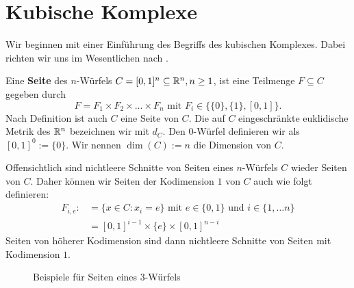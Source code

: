 \section{Kubische Komplexe}
	Wir beginnen mit einer Einführung des Begriffs des kubischen Komplexes. Dabei richten wir uns im Wesentlichen nach \cite{SchwerLectureNotes}.

\begin{defn}
	Eine \textbf{Seite} des $n$-Würfels $C=[0,1]^n \subseteq \mathbb{R}^n, n \geq 1$, ist eine Teilmenge $F \subseteq C$ gegeben durch
	\[
		F = F_1 \times F_2 \times \dots \times F_n \text{ mit } F_i \in \{ \{0\}, \{1\}, [0,1]\}.
	\]
	Nach Definition ist auch $C$ eine Seite von $C$. Die auf $C$ eingeschränkte euklidische Metrik des $\mathbb{R}^n$ bezeichnen wir mit $d_C$. Den $0$-Würfel definieren wir als $[0,1]^0 := \{0\}$. Wir nennen $\dim(C) := n$ die Dimension von $C$.
\end{defn}

	Offensichtlich sind nichtleere Schnitte von Seiten eines $n$-Würfels $C$ wieder Seiten von $C$. Daher können wir Seiten der Kodimension $1$ von $C$ auch wie folgt definieren:
	\begin{equation}
	\begin{aligned}
		F_{i,e} :&= \{x \in C : x_i = e\} \text{ mit } e \in \{0,1\} \text{ und } i \in \{1, \dots n\} \\
		&= [0,1]^{i-1} \times \{e\} \times [0,1]^{n-i}
	\end{aligned}
	\end{equation}
	Seiten von höherer Kodimension sind dann nichtleere Schnitte von Seiten mit Kodimension $1$.
	
\begin{figure}[h]
\centering
{}
\caption*{Beispiele für Seiten eines $3$-Würfels}
\end{figure}

